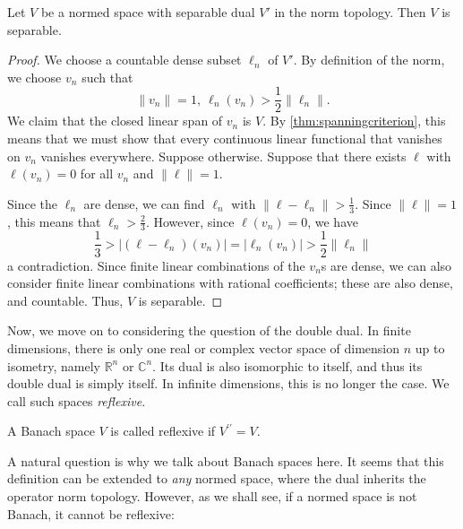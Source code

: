 \documentclass[twoside,symmetric, openany, 12pt]{./tuftebook}
\theoremstyle{definition}
\theoremstyle{definition}
\theoremstyle{definition}
\newcommand{\R}{\mathbb{R}}
\newcommand{\C}{\mathbb{C}}
\begin{document}
\begin{Theorem}
	Let $V$ be a normed space with separable dual $V'$ in the norm topology. Then $V$ is separable. 
\end{Theorem}
\begin{proof}
	We choose a countable dense subset $\ell_n$ of $V'$. By definition of the norm, we choose $v_n$ such that
	\[
	\|v_n\|=1,~ \ell_n(v_n)>\frac{1}{2}\|\ell_n\|
	.\] 
	We claim that the closed linear span of $v_n$ is $V$. By \ref{thm:spanningcriterion}, this means that we must show that every continuous linear functional that vanishes on $v_n$ vanishes everywhere. Suppose otherwise. Suppose that there exists $\ell$ with $\ell(v_n)=0$ for all $v_n$ and $\| \ell\| = 1$. 
	
	Since the $\ell_n$ are dense, we can find $\ell_n$ with $\| \ell - \ell_n\| > \frac 13$. Since $\|\ell\|=1$, this means that $\ell_n > \frac 23$. However, since $\ell(v_n)=0$, we have
	\[\frac 13 > |(\ell - \ell_n)(v_n)| = |\ell_n(v_n)|> \frac 12 \| \ell_n\|\]
	a contradiction. Since finite linear combinations of the $v_n$s are dense, we can also consider finite linear combinations with rational coefficients; these are also dense, and countable. Thus, $V$ is separable. 
\end{proof}
Now, we move on to considering the question of the double dual. In finite dimensions, there is only one real or complex vector space of dimension $n$ up to isometry, namely $\R^n$ or $\C^n$. Its dual is also isomorphic to itself, and thus its double dual is simply itself. In infinite dimensions, this is no longer the case. We call such spaces \emph{reflexive}.
\begin{Definition}
	A Banach space $V$ is called reflexive if $V^{\prime\prime}=V$.  
\end{Definition}
A natural question is why we talk about Banach spaces here. It seems that this definition can be extended to \emph{any} normed space, where the dual inherits the operator norm topology. However, as we shall see, if a normed space is not Banach, it cannot be reflexive:
\end{document}
